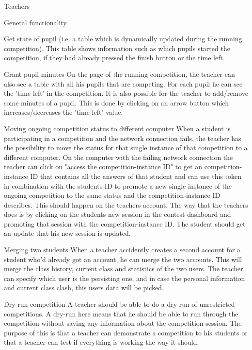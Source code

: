 \begin{section}{Teachers}
\begin{subsection}{General functionality}
\begin{subsubsection}{Get state of pupil}
            (i.e. a table which is dynamically updated during the running competition). This table shows information such as which pupils started the competition, if they had already pressed the finish button or the time left. 
        \end{subsubsection}
        \begin{subsubsection}{Grant pupil minutes}
            On the page of the running competition, the teacher can also see a table with all his pupils that are competing. For each pupil he can see the 'time left' in the competition. It is also possible for the teacher to add/remove some minutes of a pupil. This is done by clicking on an arrow button which increases/decreases the 'time left' value.
        \end{subsubsection}
        \begin{subsubsection}{Moving ongoing competition status to different computer}
            When a student is participating in a competition and the network connection fails, the teacher has the possibility to move the status for that single instance of that competition to a different computer. On the computer with the failing network connection the teacher can click on "access the competition-instance ID" to get an competition-instance ID that contains all the answers of that student and can use this token in combination with the students ID to promote a new single instance of the ongoing competition to the same status and the competition-instance ID describes. This should happen on the teachers account. The way that the teachers does is by clicking on the students new session in the contest dashboard and promoting that session with the competition-instance ID. The student should get an update that his new session is updated. 
        \end{subsubsection}

        \begin{subsubsection}{Merging two students}
            When a teacher accidently creates a second account for a student
            who'd already got an account, he can merge the two accounts. This
            will merge the class history, current class and statistics of the
            two users. The teacher can specify which user is the persisting one,
            and in case the personal information and current class clash, this
            users data will be picked.
        \end{subsubsection}
        \begin{subsection}{Dry-run competition}
        A teacher should be able to do a dry-run of unrestricted competitions. A dry-run here means that he should be able to run through the competition without saving any information about the competition session. The purpose of this is that a teacher can demonstrate a competition to his students or that a teacher can test if everything is working the way it should.
        \end{subsection}
    \end{subsection}
		

\end{section}
